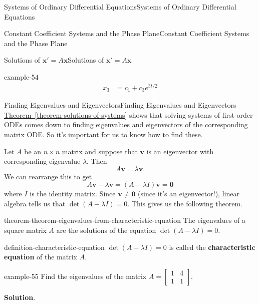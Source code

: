 \documentclass[10pt,]{book}
\newcommand{\terminology}[1]{\textbf{#1}}
\numberwithin{equation}{section}
\renewcommand{\vec}[1]{\mathbf{#1}}
\newcommand{\amp}{&}
\begin{document}
\begin{chapterptx}{Systems of Ordinary Differential Equations}{}{Systems of Ordinary Differential Equations}{}{}
\begin{sectionptx}{Constant Coefficient Systems and the Phase Plane}{}{Constant Coefficient Systems and the Phase Plane}{}{}
\begin{subsectionptx}{Solutions of \(\vec{x}' = A\vec{x}\)}{}{Solutions of \(\vec{x}' = A\vec{x}\)}{}{}
\begin{example}{}{example-54}
\begin{align*}
x_{3} \amp = c_{1}+c_{3}e^{3t/2}
\end{align*}
%
\end{example}
\end{subsectionptx}
%
%
\typeout{************************************************}
\typeout{************************************************}
%
\begin{subsectionptx}{Finding Eigenvalues and Eigenvectors}{}{Finding Eigenvalues and Eigenvectors}{}{}\label{subsection-finding-eigenvalues-and-eigenvectors}
\hypertarget{p-330}{}%
\hyperref[theorem-solutions-of-systems]{Theorem~\ref{theorem-solutions-of-systems}} shows that solving systems of first-order ODEs comes down to finding eigenvalues and eigenvectors of the corresponding matrix ODE. So it's important for us to know how to find these.%
\par
\hypertarget{p-331}{}%
Let \(A\) be an \(n\times n\) matrix and suppose that \(\vec{v}\) is an eigenvector with corresponding eigenvalue \(\lambda\). Then%
\begin{equation*}
A\vec{v} = \lambda\vec{v}.
\end{equation*}
We can rearrange this to get%
\begin{equation*}
A\vec{v}-\lambda\vec{v} = (A-\lambda I)\vec{v} = \vec{0}
\end{equation*}
where \(I\) is the identity matrix. Since \(\vec{v}\neq\vec{0}\) (since it's an eigenvector!), linear algebra tells us that \(\det(A-\lambda I) = 0\). This gives us the following theorem.%
\begin{theorem}{}{}{theorem-theorem-eigenvalues-from-characteristic-equation}%
\hypertarget{p-332}{}%
The eigenvalues of a square matrix \(A\) are the solutions of the equation \(\det(A-\lambda I) = 0\).%
\end{theorem}
\begin{definition}{}{definition-characteristic-equation}%
\hypertarget{p-333}{}%
\(\det(A-\lambda I)=0\) is called the \terminology{characteristic equation} of the matrix \(A\).%
\end{definition}
\begin{example}{}{example-55}%
\hypertarget{p-334}{}%
Find the eigenvalues of the matrix \(A = \begin{bmatrix}1\amp 4\\1\amp 1\end{bmatrix}\).%
\par\smallskip%
\noindent\textbf{Solution}.\hypertarget{solution-52}{}\quad%

\end{example}
\end{subsectionptx}
\end{sectionptx}
\end{chapterptx}
\end{document}
